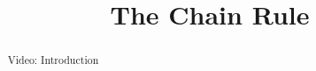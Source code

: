 \documentclass[handout]{ximera}
\title{The Chain Rule}
\begin{document}
\begin{abstract} Video: Introduction %
\end{abstract}

\maketitle

\end{document}
